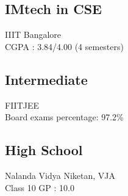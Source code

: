 \documentclass[]{karthik_sama}
\begin{document}
\begin{minipage}[t]{0.33\textwidth}
\subsection{IMtech in CSE}
IIIT Bangalore \\
CGPA : 3.84/4.00 \scriptsize{(4 semesters)}\\
\vspace{5pt}
\subsection{Intermediate}
FIITJEE\\
Board exams percentage: 97.2\%\\
\vspace{5pt}
\subsection{High School}
Nalanda Vidya Niketan, VJA\\
Class 10 GP : 10.0 \\
\sectionsep
%
%

\end{minipage} 
\hfill
\end{document}
